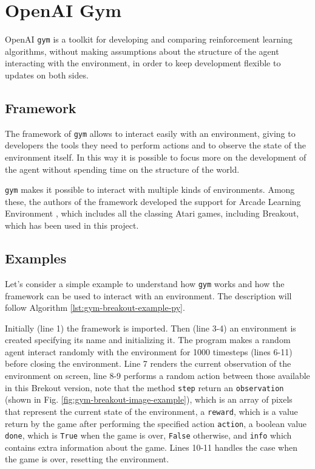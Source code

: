 \section{OpenAI Gym}
\label{sec:openaigym}
OpenAI \texttt{gym} \cite{1606.01540} is a toolkit for developing and comparing
reinforcement learning algorithms, without making assumptions about the
structure of the agent interacting with the environment, in order to
keep development flexible to updates on both sides.

\subsection{Framework}
The framework of \texttt{gym} allows to interact easily
with an environment, giving to developers the tools they need to perform
actions and to observe the state of the environment itself. In this way it is
possible to focus more on the development of the agent without spending
time on the structure of the world.

\texttt{gym} makes it possible to interact with multiple kinds of environments.
Among these, the authors of the framework developed the support for
Arcade Learning Environment \cite{bellemare13arcade}, which includes all the
classing Atari games, including Breakout, which has been used in this project.

\subsection{Examples}
Let's consider a simple example to understand how \texttt{gym} works and
how the framework can be used to interact with an environment.
The description will follow Algorithm \ref{lst:gym-breakout-example-py}.



Initially (line 1) the framework is imported. Then (line 3-4) an environment
is created specifying its name and initializing it. The program makes a
random agent interact randomly with the environment for 1000 timesteps (lines
6-11) before closing the environment. Line 7 renders the current
observation of the environment on screen, line 8-9 performs a random action
between those available in this Brekout version, note that the method
\texttt{step} return an \texttt{observation} (shown in Fig.
\ref{fig:gym-breakout-image-example}), which is an array of pixels
that represent the current state of the environment, a \texttt{reward},
which is a value return by the game after performing the specified action
\texttt{action}, a boolean value \texttt{done}, which is \texttt{True} when
the game is over, \texttt{False} otherwise, and \texttt{info} which contains
extra information about the game. Lines 10-11 handles the case when the game
is over, resetting the environment.

